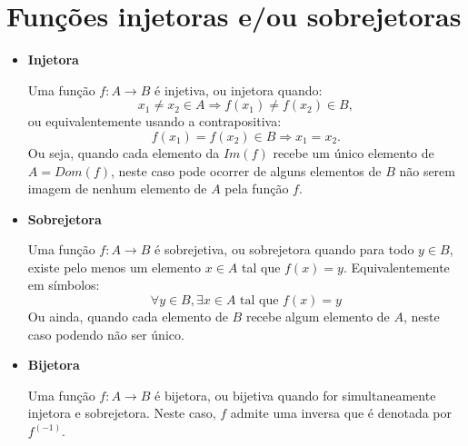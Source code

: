 \newpage
\section{Funções injetoras e/ou sobrejetoras}

\begin{itemize}
 \item \textbf{Injetora}

 Uma função $f: A \rightarrow B$ é injetiva, ou injetora quando:
\begin{equation}
 x_1 \neq x_2 \in A \Rightarrow f(x_1) \neq f(x_2) \in B ,
\end{equation}
 ou equivalentemente usando a contrapositiva:
\begin{equation}
f(x_1) = f(x_2) \in B \Rightarrow x_1 = x_2 .
\end{equation}
 Ou seja, quando cada elemento da $Im(f)$ recebe um único elemento de $A= Dom(f)$, neste caso pode ocorrer de alguns elementos de $B$ não serem imagem de nenhum elemento de $A$ pela função $f$.

 \item \textbf{Sobrejetora}

 Uma função $f: A \rightarrow B$ é sobrejetiva, ou sobrejetora quando para todo $y \in B$, existe pelo menos um elemento $x \in A$ tal que $f(x) = y$. Equivalentemente em símbolos:
\begin{equation}
\forall y \in B, \exists x \in A \text{ tal que } f(x) = y
\end{equation}
 Ou ainda, quando cada elemento de $B$ recebe algum elemento de $A$, neste caso podendo não ser único.

 \item \textbf{Bijetora}

 Uma função $f: A \rightarrow B$ é bijetora, ou bijetiva quando for simultaneamente injetora e sobrejetora. Neste caso, $f$ admite uma inversa que é denotada por $f^{(-1)}$.

\end{itemize}

